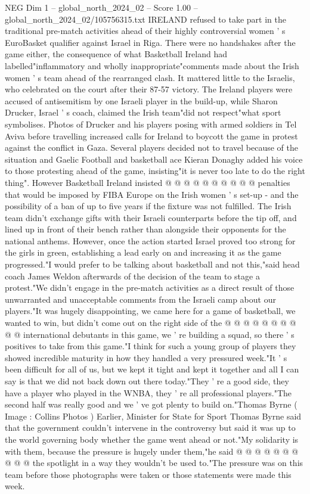 \begin{textsample}{NEG Dim 1 – global\_north\_2024\_02 – Score 1.00 – global\_north\_2024\_02/105756315.txt}  \label{ex:f1_neg_349}
IRELAND refused to take part in the traditional pre-match activities ahead of their highly controversial women ' s EuroBasket qualifier against Israel in Riga.
There were no handshakes after the game either, the consequence of what Basketball Ireland had labelled"inflammatory and wholly inappropriate"comments made about the Irish women ' s team ahead of the rearranged clash.
It mattered little to the Israelis, who celebrated on the court after their 87-57 victory.
The Ireland players were accused of antisemitism by one Israeli player in the build-up, while Sharon Drucker, Israel ' s coach, claimed the Irish team"did not respect"what sport symbolises.
Photos of Drucker and his players posing with armed soldiers in Tel Aviva before travelling increased calls for Ireland to boycott the game in protest against the conflict in Gaza.
Several players decided not to travel because of the situation and Gaelic Football and basketball ace Kieran Donaghy added his voice to those protesting ahead of the game, insisting"it is never too late to do the right thing".
However Basketball Ireland insisted @ @ @ @ @ @ @ @ @ @ penalties that would be imposed by FIBA Europe on the Irish women ' s set-up - and the possibility of a ban of up to five years if the fixture was not fulfilled.
The Irish team didn't exchange gifts with their Israeli counterparts before the tip off, and lined up in front of their bench rather than alongside their opponents for the national anthems.
However, once the action started Israel proved too strong for the girls in green, establishing a lead early on and increasing it as the game progressed."I would prefer to be talking about basketball and not this,"said head coach James Weldon afterwards of the decision of the team to stage a protest."We didn't engage in the pre-match activities as a direct result of those unwarranted and unacceptable comments from the Israeli camp about our players."It was hugely disappointing, we came here for a game of basketball, we wanted to win, but didn't come out on the right side of the @ @ @ @ @ @ @ @ @ @ international debutants in this game, we ' re building a squad, so there ' s positives to take from this game."I think for such a young group of players they showed incredible maturity in how they handled a very pressured week."It ' s been difficult for all of us, but we kept it tight and kept it together and all I can say is that we did not back down out there today."They ' re a good side, they have a player who played in the WNBA, they ' re all professional players."The second half was really good and we ' ve got plenty to build on."Thomas Byrne ( Image : Collins Photos ) Earlier, Minister for State for Sport Thomas Byrne said that the government couldn't intervene in the controversy but said it was up to the world governing body whether the game went ahead or not."My solidarity is with them, because the pressure is hugely under them,"he said @ @ @ @ @ @ @ @ @ @ the spotlight in a way they wouldn't be used to."The pressure was on this team before those photographs were taken or those statements were made this week.

\end{textsample}
